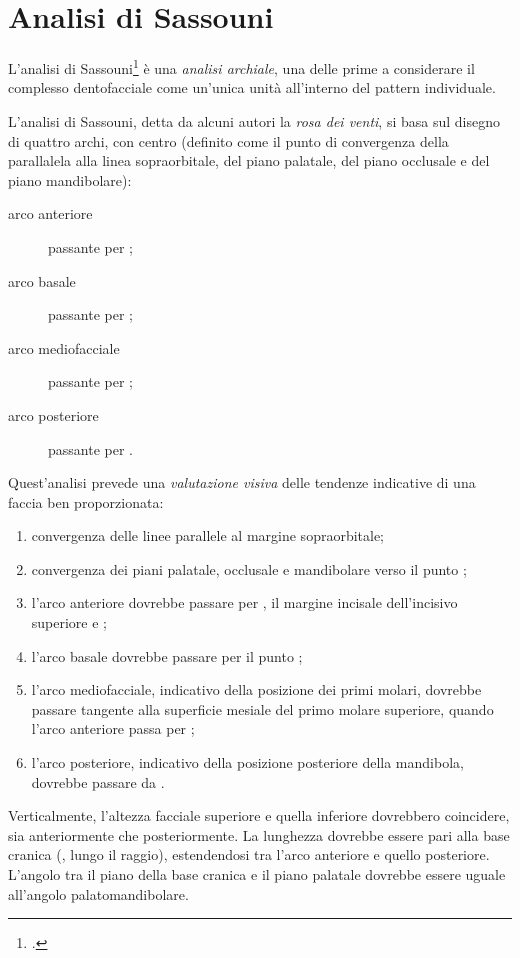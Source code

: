 \chapter{Analisi di Sassouni}
L'analisi di Sassouni\footcite{Sassouni1955,Sassouni1969} è una \textit{analisi archiale}, una delle prime a considerare il complesso dentofacciale come un'unica unità all'interno del pattern individuale.

L'analisi di Sassouni, detta da alcuni autori la \textit{rosa dei venti}, si basa sul disegno di quattro archi, con centro  (definito come il punto di convergenza della parallalela alla linea sopraorbitale, del piano palatale, del piano occlusale e del piano mandibolare):

\begin{description}
\item[arco anteriore] passante per ;
\item[arco basale] passante per ;
\item[arco mediofacciale] passante per ;
\item[arco posteriore] passante per .
\end{description}

Quest'analisi prevede una \textit{valutazione visiva} delle tendenze indicative di una faccia ben proporzionata:

\begin{enumerate}
\item convergenza delle linee parallele al margine sopraorbitale;
\item convergenza dei piani palatale, occlusale e mandibolare verso il punto ;
\item l'arco anteriore dovrebbe passare per , il margine incisale dell'incisivo superiore e ;
\item l'arco basale dovrebbe passare per il punto ;
\item l'arco mediofacciale, indicativo della posizione dei primi molari, dovrebbe passare tangente alla superficie mesiale del primo molare superiore, quando l'arco anteriore passa per ;
\item l'arco posteriore, indicativo della posizione posteriore della mandibola, dovrebbe passare da .
\end{enumerate}

Verticalmente, l'altezza facciale superiore e quella inferiore dovrebbero coincidere, sia anteriormente che posteriormente. La lunghezza  dovrebbe essere pari alla base cranica (, lungo il raggio), estendendosi tra l'arco anteriore e quello posteriore. L'angolo tra il piano della base cranica e il piano palatale dovrebbe essere uguale all'angolo palatomandibolare.

